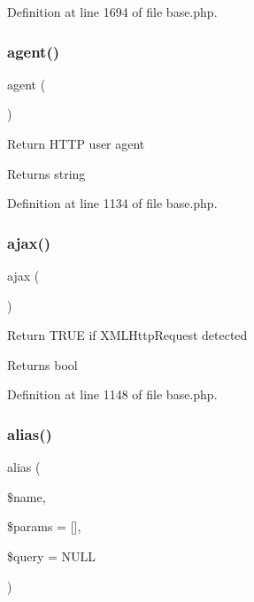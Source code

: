 Definition at line 1694 of file base.\+php.

\hypertarget{class_base_a77f6a261d70e66c7b7273774832482dc}{}\label{class_base_a77f6a261d70e66c7b7273774832482dc} 
\subsubsection{\texorpdfstring{agent()}{agent()}}
{\footnotesize\ttfamily agent (\begin{DoxyParamCaption}{ }\end{DoxyParamCaption})}

Return H\+T\+TP user agent \begin{DoxyReturn}{Returns}
string 
\end{DoxyReturn}


Definition at line 1134 of file base.\+php.

\hypertarget{class_base_a73a8e42630137b1b11246d16d7cd23d5}{}\label{class_base_a73a8e42630137b1b11246d16d7cd23d5} 
\subsubsection{\texorpdfstring{ajax()}{ajax()}}
{\footnotesize\ttfamily ajax (\begin{DoxyParamCaption}{ }\end{DoxyParamCaption})}

Return T\+R\+UE if X\+M\+L\+Http\+Request detected \begin{DoxyReturn}{Returns}
bool 
\end{DoxyReturn}


Definition at line 1148 of file base.\+php.

\hypertarget{class_base_a222997c88655e69eb1bb3a18147ddc3d}{}\label{class_base_a222997c88655e69eb1bb3a18147ddc3d} 
\subsubsection{\texorpdfstring{alias()}{alias()}}
{\footnotesize\ttfamily alias (\begin{DoxyParamCaption}\item[{}]{\$name,  }\item[{}]{\$params = {\ttfamily \mbox{[}\mbox{]}},  }\item[{}]{\$query = {\ttfamily NULL} }\end{DoxyParamCaption})}

